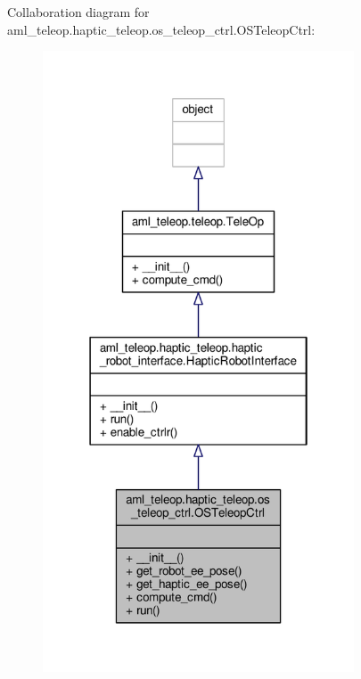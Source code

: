 Collaboration diagram for aml\-\_\-teleop.\-haptic\-\_\-teleop.\-os\-\_\-teleop\-\_\-ctrl.\-O\-S\-Teleop\-Ctrl\-:
\nopagebreak
\begin{figure}[H]
\begin{center}
\leavevmode
\includegraphics[width=262pt]{classaml__teleop_1_1haptic__teleop_1_1os__teleop__ctrl_1_1_o_s_teleop_ctrl__coll__graph}
\end{center}
\end{figure}
